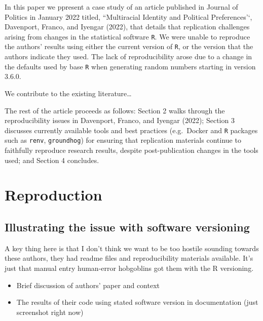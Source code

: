 \documentclass[
  letterpaper,
  DIV=11,
  numbers=noendperiod]{scrartcl}
\providecommand{\tightlist}{%
  \setlength{\itemsep}{0pt}\setlength{\parskip}{0pt}}\usepackage{longtable,booktabs,array}
\begin{document}
In this paper we ppresent a case study of an article published in
Journal of Politics in January 2022 titled, ``Multiracial Identity and
Political Preferences'`, Davenport, Franco, and Iyengar (2022), that
details that replication challenges arising from changes in the
statistical software \texttt{R}. We were unable to reproduce the
authors' results using either the current version of \texttt{R}, or the
version that the authors indicate they used. The lack of reproducibility
arose due to a change in the defaults used by base \texttt{R} when
generating random numbers starting in version 3.6.0.

We contribute to the existing literature\ldots{}

The rest of the article proceeds as follows: Section 2 walks through the
reproducibility issues in Davenport, Franco, and Iyengar (2022); Section
3 discusses currently available tools and best practices (e.g.~Docker
and \texttt{R} packages such as \texttt{renv}, \texttt{groundhog}) for
ensuring that replication materials continue to faithfully reproduce
research results, despite post-publication changes in the tools used;
and Section 4 concludes.

\newpage

\hypertarget{reproduction}{%
\section{Reproduction}\label{reproduction}}

\hypertarget{illustrating-the-issue-with-software-versioning}{%
\subsection{Illustrating the issue with software
versioning}\label{illustrating-the-issue-with-software-versioning}}

A key thing here is that I don't think we want to be too hostile
sounding towards these authors, they had readme files and
reproducibility materials available. It's just that manual entry
human-error hobgoblins got them with the R versioning.

\begin{itemize}
\tightlist
\item
  Brief discussion of authors' paper and context
\item
  The results of their code using stated software version in
  documentation (just screenshot right now)
\end{itemize}
\end{document}
